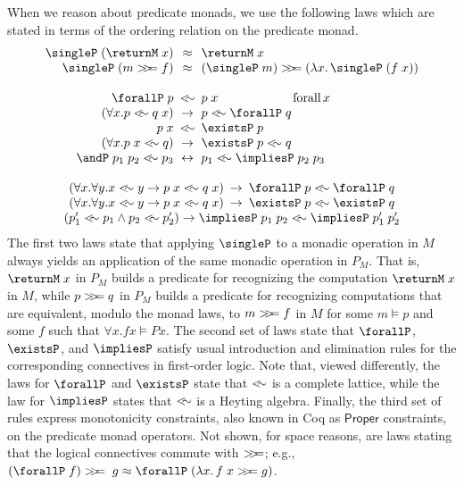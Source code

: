 \documentclass[preprint]{sigplanconf}
\begin{document}
When we reason about predicate monads, we use the following laws which are stated in terms of the ordering relation on the predicate monad.
\[
\begin{array}{@{}c@{}}
\begin{array}{@{}r@{\hspace{5pt}}c@{\hspace{5pt}}l@{}}
  \singleP\;(\returnM\;x) & \lreq & \returnM\;x\\
  \singleP\;(m \bind f) & \lreq
  & (\singleP\;m)\bind (\lamabsnot{x}{\singleP\;(f\;x)})
  \\ \\
  \forallP\;p & \lrleq & p\;x \qquad\qquad\qquad\textrm{forall}\,x\\
  (\forall x. p \lrleq q\;x) & \to & p \lrleq \forallP\;q\\
  p\;x & \lrleq & \existsP\;p\\
  (\forall x. p\;x \lrleq q) & \to & \existsP\;p \lrleq q\\
  \andP\;p_1\;p_2 \lrleq p_3 & \leftrightarrow & p_1 \lrleq \impliesP\;p_2\;p_3
\end{array}
  \\ \\
\begin{array}{@{}r@{\hspace{5pt}}c@{\hspace{5pt}}l@{}}
  (\forall x.\forall y. x\lrleq y \to p\;x \lrleq q\;x)
  & \to & \forallP\;p \lrleq \forallP\;q\\
  (\forall x.\forall y. x\lrleq y \to p\;x \lrleq q\;x)
  & \to & \existsP\;p \lrleq \existsP\;q
\end{array}
  \\
  (p_1'\lrleq p_1 \wedge p_2\lrleq p_2') \to
  \impliesP\;p_1\;p_2 \lrleq \impliesP\;p_1'\;p_2'
\end{array}
\]
The first two laws state that applying $\singleP$ to a monadic operation in $M$
always yields an application of the same monadic operation in $P_M$. That is,
$\returnM\;x$ in $P_M$ builds a predicate for recognizing the computation
$\returnM\;x$ in $M$, while $p>\!\!>\!\!= q$ in $P_M$ builds a predicate for
recognizing computations that are equivalent, modulo the monad laws, to
$m>\!\!>\!\!= f$ in $M$ for some $m\vDash p$ and some $f$ such that
$\forall x.f x \vDash P x$.
%
The second set of laws state that $\forallP$, $\existsP$, and $\impliesP$
satisfy usual introduction and elimination rules for the corresponding
connectives in first-order logic. Note that, viewed differently, the laws for
$\forallP$ and $\existsP$ state that $<\!\!\sim$ is a complete lattice, while the
law for $\impliesP$ states that $<\!\!\sim$ is a Heyting algebra.
%
Finally, the third set of rules express monotonicity constraints, also known in
Coq as $\mathsf{Proper}$ constraints, on the predicate monad operators.
%
Not shown, for space reasons, are laws stating that the logical connectives
commute with $>\!\!>\!\!=$; e.g.,
$(\forallP\;f)\bind\;g\lreq\forallP\;(\lamabsnot{x}{f\;x\bind g})$.
\end{document}
